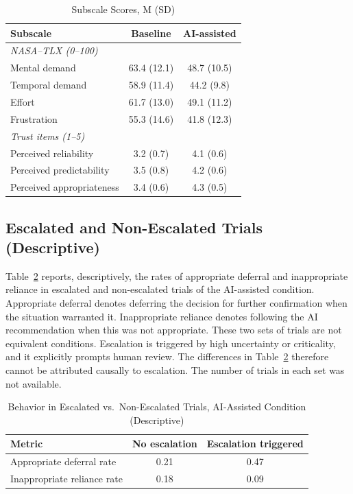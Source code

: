 \documentclass[journal]{IEEEtran}
\theoremstyle{plain}
\theoremstyle{definition}
\begin{document}
    \begin{table}[t]
        \caption{Subscale Scores, M (SD)}
        \label{tab:subscales}
        \centering
        \begin{tabular}{lcc}
            \toprule
            \textbf{Subscale} & \textbf{Baseline} & \textbf{AI-assisted} \\
            \midrule
            \multicolumn{3}{l}{\emph{NASA--TLX (0--100)}} \\
            Mental demand & 63.4 (12.1) & 48.7 (10.5) \\
            Temporal demand & 58.9 (11.4) & 44.2 (9.8) \\
            Effort & 61.7 (13.0) & 49.1 (11.2) \\
            Frustration & 55.3 (14.6) & 41.8 (12.3) \\
            \midrule
            \multicolumn{3}{l}{\emph{Trust items (1--5)}} \\
            Perceived reliability & 3.2 (0.7) & 4.1 (0.6) \\
            Perceived predictability & 3.5 (0.8) & 4.2 (0.6) \\
            Perceived appropriateness & 3.4 (0.6) & 4.3 (0.5) \\
            \bottomrule
        \end{tabular}
    \end{table}

    \subsection{Escalated and Non-Escalated Trials (Descriptive)}
    \label{sec:res_escalation}
    Table~\ref{tab:escalation} reports, descriptively, the rates of appropriate deferral and inappropriate reliance in escalated and non-escalated trials of the AI-assisted condition. Appropriate deferral denotes deferring the decision for further confirmation when the situation warranted it. Inappropriate reliance denotes following the AI recommendation when this was not appropriate. These two sets of trials are not equivalent conditions. Escalation is triggered by high uncertainty or criticality, and it explicitly prompts human review. The differences in Table~\ref{tab:escalation} therefore cannot be attributed causally to escalation. The number of trials in each set was not available.

    \begin{table}[t]
        \caption{Behavior in Escalated vs.\ Non-Escalated Trials, AI-Assisted Condition (Descriptive)}
        \label{tab:escalation}
        \centering
        \begin{tabular}{lcc}
            \toprule
            \textbf{Metric} & \textbf{No escalation} & \textbf{Escalation triggered} \\
            \midrule
            Appropriate deferral rate & 0.21 & 0.47 \\
            Inappropriate reliance rate & 0.18 & 0.09 \\
            \bottomrule
        \end{tabular}
    \end{table}
\end{document}
